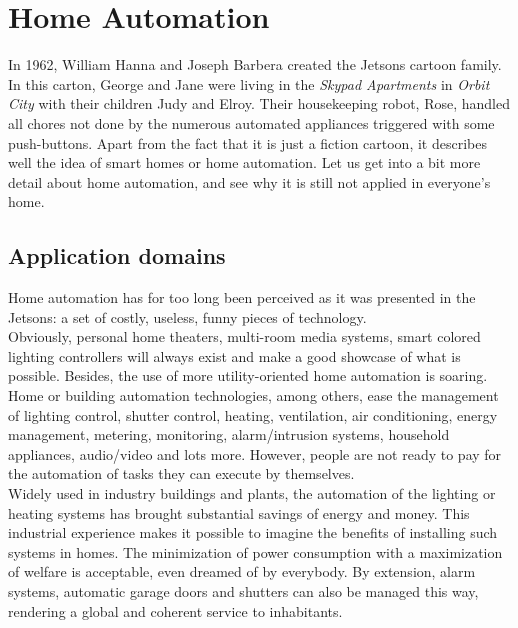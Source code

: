 \section{Home Automation}
\label{sec:context.homeautomation}


In 1962, William Hanna and Joseph Barbera created the Jetsons cartoon family. In this carton, George and Jane were living in the \textit{Skypad Apartments} in \textit{Orbit City} with their children Judy and Elroy. Their housekeeping robot, Rose, handled all chores not done by the numerous automated appliances triggered with some push-buttons. Apart from the fact that it is just a fiction cartoon, it describes well the idea of smart homes or home automation. Let us get into a bit more detail about home automation, and see why it is still not applied in everyone's home.


\subsection{Application domains}
Home automation has for too long been perceived as it was presented in the Jetsons: a set of costly, useless, funny pieces of technology.\\
Obviously, personal home theaters, multi-room media systems, smart colored lighting controllers will always exist and make a good showcase of what is possible. Besides, the use of more utility-oriented home automation is soaring. Home or building automation technologies, among others, ease the management of lighting control, shutter control, heating, ventilation, air conditioning, energy management, metering, monitoring, alarm/intrusion systems, household appliances, audio/video and lots more. However, people are not ready to pay for the automation of tasks they can execute by themselves.\\
Widely used in industry buildings and plants, the automation of the lighting or heating systems has brought substantial savings of energy and money. This industrial experience makes it possible to imagine the benefits of installing such systems in homes. The minimization of power consumption with a maximization of welfare is acceptable, even dreamed of by everybody.
By extension, alarm systems, automatic garage doors and shutters can also be managed this way, rendering a global and coherent service to inhabitants. 

